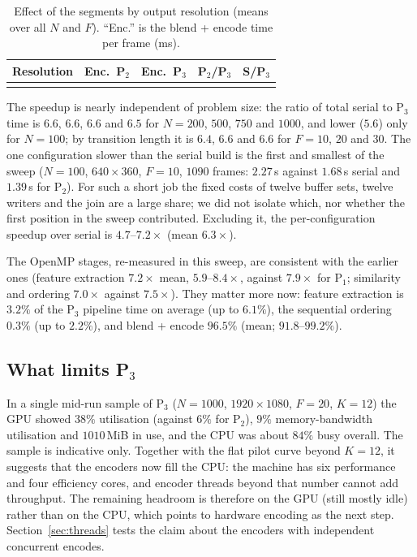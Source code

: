 \documentclass[conference]{IEEEtran}
\begin{document}
\begin{table}[t]
\caption{Effect of the segments by output resolution (means over all $N$ and $F$). ``Enc.'' is the blend + encode time per frame (ms).}
\label{tab:seg-res}
\centering
\footnotesize
\setlength{\tabcolsep}{5pt}
\begin{tabular}{@{}lcccc@{}}
\toprule
Resolution & Enc.\ P$_2$ & Enc.\ P$_3$ & P$_2$/P$_3$ & S/P$_3$ \\
\midrule
\\
\bottomrule
\end{tabular}
\end{table}

The speedup is nearly independent of problem size: the ratio of total serial to P$_3$ time is $6.6$, $6.6$, $6.6$ and $6.5$ for $N{=}200$, $500$, $750$ and $1000$, and lower ($5.6$) only for $N{=}100$; by transition length it is $6.4$, $6.6$ and $6.6$ for $F{=}10$, $20$ and $30$. The one configuration slower than the serial build is the first and smallest of the sweep ($N{=}100$, $640\times360$, $F{=}10$, $1090$ frames: $2.27$\,s against $1.68$\,s serial and $1.39$\,s for P$_2$). For such a short job the fixed costs of twelve buffer sets, twelve writers and the join are a large share; we did not isolate which, nor whether the first position in the sweep contributed. Excluding it, the per-configuration speedup over serial is $4.7$--$7.2\times$ (mean $6.3\times$).

The OpenMP stages, re-measured in this sweep, are consistent with the earlier ones (feature extraction $7.2\times$ mean, $5.9$--$8.4\times$, against $7.9\times$ for P$_1$; similarity and ordering $7.0\times$ against $7.5\times$). They matter more now: feature extraction is $3.2\%$ of the P$_3$ pipeline time on average (up to $6.1\%$), the sequential ordering $0.3\%$ (up to $2.2\%$), and blend + encode $96.5\%$ (mean; $91.8$--$99.2\%$).

\subsection{What limits P$_3$}
In a single mid-run sample of P$_3$ ($N{=}1000$, $1920\times1080$, $F{=}20$, $K{=}12$) the GPU showed $38\%$ utilisation (against $6\%$ for P$_2$), $9\%$ memory-bandwidth utilisation and $1010$\,MiB in use, and the CPU was about $84\%$ busy overall. The sample is indicative only. Together with the flat pilot curve beyond $K{=}12$, it suggests that the encoders now fill the CPU: the machine has six performance and four efficiency cores, and encoder threads beyond that number cannot add throughput. The remaining headroom is therefore on the GPU (still mostly idle) rather than on the CPU, which points to hardware encoding as the next step. Section~\ref{sec:threads} tests the claim about the encoders with independent concurrent encodes.
\end{document}
